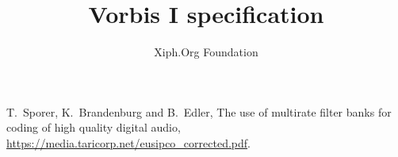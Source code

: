 \documentclass[12pt,paper=a4]{scrartcl}
\renewcommand{\~}{$\sim$}
\begin{document}
\title{Vorbis I specification}
\author{Xiph.Org Foundation}
\maketitle

\tableofcontents












\appendix





 
\begin{thebibliography}{99} 
 
 T.~Sporer, K.~Brandenburg and B.~Edler, 
The use of multirate filter banks for coding of high quality digital audio,
\url{https://media.taricorp.net/eusipco_corrected.pdf}.


\end{thebibliography}
\end{document}
